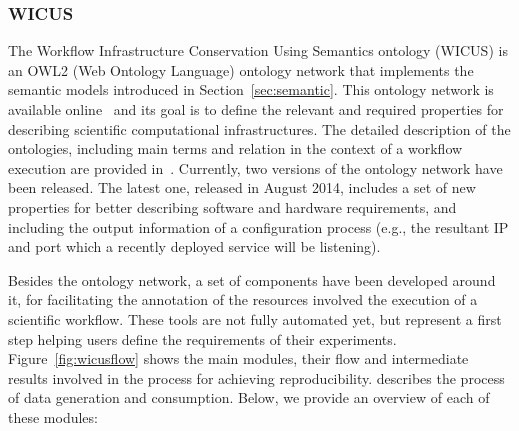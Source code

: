 \subsubsection{WICUS}
\label{subsec:wicus}

The Workflow Infrastructure Conservation Using Semantics ontology 
(WICUS) is an OWL2 (Web Ontology Language) ontology network that 
implements the semantic models introduced in Section~\ref{sec:semantic}. This ontology 
network is available online~\cite{wicus-online} and its goal is to define the relevant and 
required properties for describing scientific computational infrastructures. 
The detailed description of the ontologies, including  main terms and relation
in the context of a workflow execution are provided in~\cite{wicus}.
Currently, two versions of the ontology network have been released. The latest one, released in
August 2014,  includes a set of new properties for better describing software and hardware requirements, 
and  including the output information of a configuration process (e.g., the resultant IP and port 
which a recently deployed service will be listening).


Besides the ontology network, a set of components have been developed around it, 
for facilitating the annotation of the resources involved  the execution of a scientific workflow. 
These tools are not fully automated yet, but represent a first step  helping users define the requirements of their 
experiments. Figure~\ref{fig:wicusflow} shows the main modules, their flow and intermediate 
results involved in the process for achieving reproducibility.  describes the process of 
data generation and consumption. Below, we provide an overview of each of these modules:

